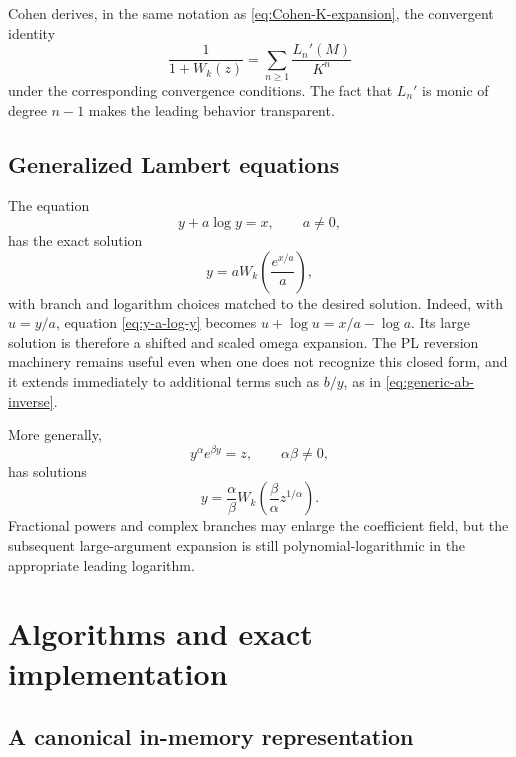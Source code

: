 \documentclass[11pt,oneside]{article}
\numberwithin{equation}{section}
\theoremstyle{definition}
\begin{document}
Cohen derives, in the same notation as \eqref{eq:Cohen-K-expansion}, the
convergent identity
\begin{equation}\label{eq:W-denominator-Ln}
  \frac{1}{1+W_k(z)}
  =\sum_{n\ge1}\frac{L_n'(M)}{K^n}
\end{equation}
under the corresponding convergence conditions.  The fact that \(L_n'\) is
monic of degree \(n-1\) makes the leading behavior transparent.

\subsection{Generalized Lambert equations}

The equation
\begin{equation}\label{eq:y-a-log-y}
  y+a\log y=x,
  \qquad a\ne0,
\end{equation}
has the exact solution
\begin{equation}\label{eq:y-a-log-y-solution}
  y=aW_k\!\left(\frac{e^{x/a}}{a}\right),
\end{equation}
with branch and logarithm choices matched to the desired solution.  Indeed, with
\(u=y/a\), equation \eqref{eq:y-a-log-y} becomes
\(u+\log u=x/a-\log a\).  Its large solution is therefore a shifted and scaled
omega expansion.  The PL reversion machinery remains useful even when one does
not recognize this closed form, and it extends immediately to additional terms
such as \(b/y\), as in \eqref{eq:generic-ab-inverse}.

More generally,
\begin{equation}\label{eq:power-exponential-equation}
  y^\alpha e^{\beta y}=z,
  \qquad \alpha\beta\ne0,
\end{equation}
has solutions
\begin{equation}\label{eq:power-exponential-solution}
  y=\frac{\alpha}{\beta}
  W_k\!\left(\frac{\beta}{\alpha}z^{1/\alpha}\right).
\end{equation}
Fractional powers and complex branches may enlarge the coefficient field, but
the subsequent large-argument expansion is still polynomial-logarithmic in the
appropriate leading logarithm.

\section{Algorithms and exact implementation}\label{sec:implementation}

\subsection{A canonical in-memory representation}
\end{document}
